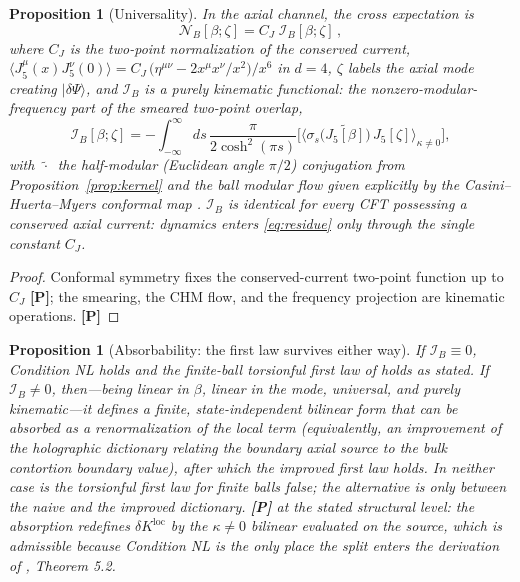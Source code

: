 \documentclass[11pt]{article}
\newtheorem{proposition}[theorem]{Proposition}
\theoremstyle{definition}
\newcommand{\pP}{\textbf{[P]}}
\begin{document}
\begin{proposition}[Universality]
\label{prop:universal}
In the axial channel, the cross expectation is
\begin{equation}
\mathcal N_B[\beta;\zeta]
=C_J\;\mathcal I_B[\beta;\zeta]\,,
\label{eq:residue}
\end{equation}
where $C_J$ is the two-point normalization of the conserved current,
$\langle J_5^\mu(x)J_5^\nu(0)\rangle
=C_J\,\big(\eta^{\mu\nu}-2x^\mu x^\nu/x^2\big)/x^{6}$ in $d=4$, $\zeta$
labels the axial mode creating $|\delta\Psi\rangle$, and $\mathcal I_B$ is
a purely kinematic functional: the nonzero-modular-frequency part of the
smeared two-point overlap,
\begin{equation}
\mathcal I_B[\beta;\zeta]
=-\!\int_{-\infty}^{\infty}\!\!ds\,\frac{\pi}{2\cosh^2(\pi s)}
\Big[\big\langle
\sigma_s\big(\widetilde{J_5[\beta]}\big)\,J_5[\zeta]
\big\rangle_{\kappa\neq0}\Big],
\label{eq:integral}
\end{equation}
with $\widetilde{\,\cdot\,}$ the half-modular (Euclidean angle $\pi/2$)
conjugation from Proposition~\ref{prop:kernel} and the ball modular flow
given explicitly by the Casini--Huerta--Myers conformal map
\cite{CHM2011}. $\mathcal I_B$ is identical for every CFT possessing a
conserved axial current: dynamics enters \eqref{eq:residue} only through
the single constant $C_J$.
\end{proposition}

\begin{proof}
Conformal symmetry fixes the conserved-current two-point function up to
$C_J$ \pP{}; the smearing, the CHM flow, and the frequency projection are
kinematic operations. \pP{}
\end{proof}

\begin{proposition}[Absorbability: the first law survives either way]
\label{prop:absorb}
If $\mathcal I_B\equiv0$, Condition NL holds and the finite-ball
torsionful first law of \cite{McGwier2026b} holds as stated. If
$\mathcal I_B\neq0$, then---being linear in $\beta$, linear in the mode,
universal, and purely kinematic---it defines a finite, state-independent
bilinear form that can be absorbed as a renormalization of the local term
(equivalently, an improvement of the holographic dictionary relating the
boundary axial source to the bulk contortion boundary value), after which
the improved first law holds. In neither case is the torsionful first law
for finite balls false; the alternative is only between the naive and the
improved dictionary. \pP{} at the stated structural level: the absorption
redefines $\delta K^{\mathrm{loc}}$ by the $\kappa\neq0$ bilinear
evaluated on the source, which is admissible because Condition NL is the
\emph{only} place the split enters the derivation of
\cite{McGwier2026b}, Theorem 5.2.
\end{proposition}
\end{document}
